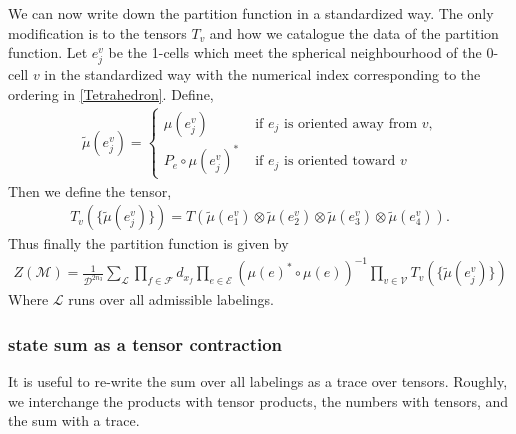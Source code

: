 \documentclass[12pt,a4paper]{article}
\newcounter{arrow}
\newcommand{\tp}{\otimes}
\newcommand{\ra}{\rightarrow}
\newcommand{\mce}{\mathcal{E}}
\newcommand{\cc}{\mathbb{C}}
\newcommand{\mcd}{\mathcal{D}}
\newcommand{\mcl}{\mathcal{L}}
\newcommand{\mcm}{\mathcal{M}}
\newcommand{\mcv}{\mathcal{V}}
\newcommand{\mcf}{\mathcal{F}}
\begin{document}
We can now write down the partition function in a standardized way. 
The only modification is to the tensors $T_v$ and how we catalogue the data of the partition function.
Let $e_j^v$ be the 1-cells which meet the spherical neighbourhood of the 0-cell $v$
 in the standardized way
with the numerical index corresponding to the ordering in \eqref{Tetrahedron}.
Define,
\begin{align}
\tilde{\mu}(e_j^v) = 
\begin{cases} \mu(e_j^v)& \text{\ if $e_j$ is oriented away from $v$,}\\
P_e \circ \mu(e_j^v)^* &\text{\ if $e_j$ is oriented toward $v$} \end{cases}
\end{align}
Then we define the tensor,
\begin{align}
T_v(\{ \tilde{\mu}(e^v_j) \} ) = T(\tilde{\mu}(e_1^v) \tp \tilde{\mu}(e_2^v)\tp \tilde{\mu}(e_3^v)\tp \tilde{\mu}(e_4^v)).
\label{zero_cell_tensor}
\end{align}
Thus finally the partition function is given by
\begin{align}
Z(\mcm) = \frac{1}{\mcd^{2n_3}}\sum_{ \mcl } \prod_{f \in \mcf} d_{x_f}  \prod_{e \in \mce} (\mu(e)^*\circ \mu(e))^{-1} \prod_{v \in \mcv} T_v(\{ \tilde{\mu}(e_j^v) \})
\label{state_sum_standardized}
\end{align}
Where $\mcl$ runs over all admissible labelings.

\subsubsection{state sum as a tensor contraction}
It is useful to re-write the sum over all labelings as a trace over tensors.
Roughly, we interchange the products with tensor products, 
the numbers with tensors, and the sum with a trace. 

\end{document}
